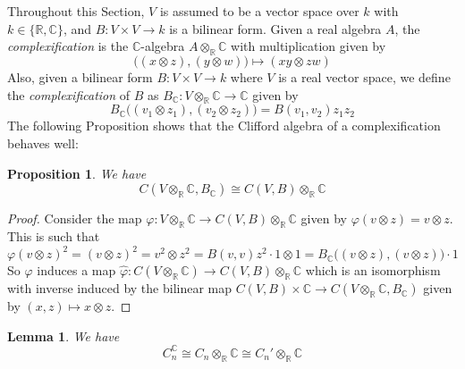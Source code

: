 \documentclass[12pt]{article}
\theoremstyle{plain}
\newtheorem{proposition}[thm]{Proposition}
\newtheorem{lemma}[thm]{Lemma}
\theoremstyle{definition}
\newcommand{\bb}[1]{\mathbb{#1}}
\newcommand{\lto}{\longrightarrow}
\begin{document}
Throughout this Section, $V$ is assumed to be a vector space over $k$ with $k \in \lbrace \bb{R},\bb{C}\rbrace$, and $B: V \times V \lto k$ is a bilinear form.
Given a real algebra $A$, the \emph{complexification} is the $\bb{C}$-algebra $A \otimes_\bb{R} \bb{C}$ with multiplication given by 
\begin{equation}
	\big((x \otimes z),(y\otimes w)\big)\longmapsto (xy \otimes zw)
\end{equation}
Also, given a bilinear form $B: V \times V \lto k$ where $V$ is a real vector space, we define the \emph{complexification} of $B$ as $B_{\bb{C}}: V \otimes_{\bb{R}} \bb{C} \lto \bb{C}$ given by
\begin{equation}
	B_{\bb{C}}\big((v_1 \otimes z_1),(v_2 \otimes z_2)\big) = B(v_1,v_2)z_1z_2
\end{equation}
The following Proposition shows that the Clifford algebra of a complexification behaves well:
\begin{proposition}
	We have
	\begin{equation}
		C(V \otimes_{\bb{R}} \bb{C}, B_{\bb{C}}) \cong C(V,B) \otimes_{\bb{R}} \bb{C}
	\end{equation}
\end{proposition}
\begin{proof}
	Consider the map $\varphi: V \otimes_{\bb{R}}\bb{C} \lto C(V,B) \otimes_{\bb{R}} \bb{C}$ given by $\varphi(v \otimes z) = v \otimes z$. This is such that
	\begin{equation}
		\varphi(v \otimes z)^2 = (v \otimes z)^2 = v^2 \otimes z^2 = B(v,v)z^2 \cdot 1 \otimes 1 = B_{\bb{C}}\big((v\otimes z),(v\otimes z)\big)\cdot 1
	\end{equation}
	So $\varphi$ induces a map $\hat{\varphi}: C(V \otimes_{\bb{R}}\bb{C}) \lto C(V,B) \otimes_{\bb{R}} \bb{C}$ which is an isomorphism with inverse induced by the bilinear map $C(V,B) \times \bb{C} \lto C(V \otimes_{\bb{R} }\bb{C}, B_{\bb{C}})$ given by $(x,z) \longmapsto x \otimes z$.
\end{proof}
\begin{lemma}\label{lem:complexification}
	We have
	\begin{equation}
		C_n^{\bb{C}} \cong C_n \otimes_{\bb{R}} \bb{C} \cong C_n' \otimes_{\bb{R}} \bb{C}
	\end{equation}
\end{lemma}
\end{document}
